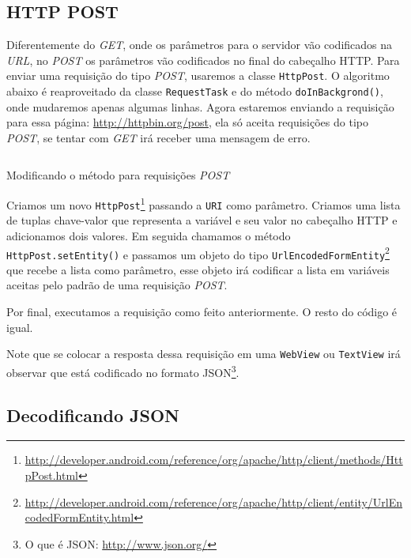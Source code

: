 \documentclass[a4paper,12pt,brazil]{book}
\begin{document}
\begin{singlespace}
		\subsection{HTTP POST}
		Diferentemente do \emph{GET}, onde os parâmetros para o servidor vão codificados na \emph{URL}, no \emph{POST} os parâmetros vão codificados no final do cabeçalho HTTP. Para enviar uma requisição do tipo \emph{POST}, usaremos a classe \texttt{HttpPost}. O algoritmo abaixo é reaproveitado da classe \texttt{RequestTask} e do método \texttt{doInBackgrond()}, onde mudaremos apenas algumas linhas. Agora estaremos enviando a requisição para essa página: \href{http://httpbin.org/post}{http://httpbin.org/post}, ela só aceita requisições do tipo \emph{POST}, se tentar com \emph{GET} irá receber uma mensagem de erro.

		\begin{listing}[H]
		\inputminted[linenos=true,fontsize=\small,frame=lines, framesep=2mm, tabsize=2,numbersep=5pt]{java}{src/api/comm/httppost.java}
		\caption{Modificando o método para requisições \emph{POST}}
		\label{code:httppost}
		\end{listing} 

		Criamos um novo \texttt{HttpPost}\footnote{\href{http://developer.android.com/reference/org/apache/http/client/methods/HttpPost.html}{http://developer.android.com/reference/org/apache/http/client/methods/HttpPost.html}} passando a \texttt{URI} como parâmetro. Criamos uma lista de tuplas chave-valor que representa a variável e seu valor no cabeçalho HTTP e adicionamos dois valores. Em seguida chamamos o método \texttt{HttpPost.setEntity()} e passamos um objeto do tipo \texttt{UrlEncodedFormEntity}\footnote{\href{http://developer.android.com/reference/org/apache/http/client/entity/UrlEncodedFormEntity.html}{http://developer.android.com/reference/org/apache/http/client/entity/UrlEncodedFormEntity.html}} que recebe a lista como parâmetro, esse objeto irá codificar a lista em variáveis aceitas pelo padrão de uma requisição \emph{POST}.

		Por final, executamos a requisição como feito anteriormente. O resto do código é igual.

 		Note que se colocar a resposta dessa requisição em uma \texttt{WebView} ou \texttt{TextView} irá observar que está codificado no formato JSON\footnote{O que é JSON: \href{http://www.json.org/}{http://www.json.org/}}. 

		\subsection{Decodificando JSON}
		

\end{singlespace}
\end{document}
